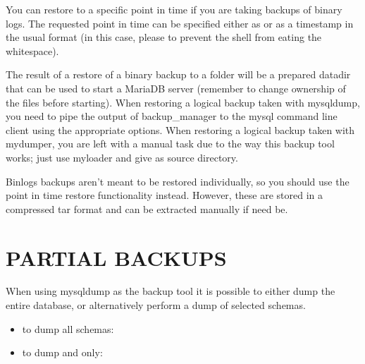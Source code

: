 \documentclass[letterpaper,10pt,english]{sphinxmanual}
\begin{document}
\sphinxAtStartPar
{}

\sphinxAtStartPar
You can restore to a specific point in time if you are taking backups of binary logs.
The requested point in time can be specified either as  or as a timestamp
in the usual  format (in this case, please 
to prevent the shell from eating the whitespace).

\sphinxAtStartPar
The result of a restore of a binary backup to a folder will be a prepared datadir
that can be used to start a MariaDB server (remember to change ownership of the files
before starting). When restoring a logical backup taken with mysqldump, you need
to pipe the output of backup\_manager to the mysql command line client using the
appropriate options. When restoring a logical backup taken with mydumper, you are
left with a manual task due to the way this backup tool works; just use myloader
and give  as source directory.

\sphinxAtStartPar
Binlogs backups aren’t meant to be restored individually, so you should use the
point in time restore functionality instead. However, these are stored in a compressed
tar format and can be extracted manually if need be.


\section{PARTIAL BACKUPS}
\label{\detokenize{mariadb-backup-manager:partial-backups}}
\sphinxAtStartPar
When using mysqldump as the backup tool it is possible to either dump the entire database, or
alternatively perform a dump of selected schemas.
\begin{itemize}
\item {} 
\sphinxAtStartPar
to dump all schemas:

\end{itemize}

\sphinxAtStartPar
{}
\begin{itemize}
\item {} 
\sphinxAtStartPar
to dump  and  only:

\end{itemize}
\end{document}
